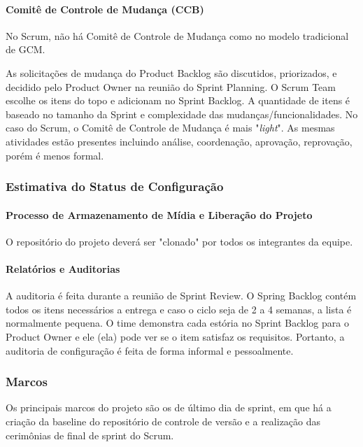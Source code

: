\paragraph{Comitê de Controle de Mudança (CCB)}

No Scrum, não há Comitê de Controle de Mudança como no modelo tradicional de GCM.

As solicitações de mudança do Product Backlog são discutidos, priorizados, e decidido pelo Product Owner na reunião do Sprint Planning. O Scrum Team escolhe os itens do topo e adicionam no Sprint Backlog. A quantidade de itens é baseado no tamanho da Sprint e complexidade das mudanças/funcionalidades. No caso do Scrum, o Comitê de Controle de Mudança é mais "\textit{light}". As mesmas atividades estão presentes incluindo análise, coordenação, aprovação, reprovação, porém é menos formal.


\subsubsection{Estimativa do Status de Configuração}

\paragraph{Processo de Armazenamento de Mídia e Liberação do Projeto}

O repositório do projeto deverá ser "clonado" por todos os integrantes da equipe.

\paragraph{Relatórios e Auditorias}

A auditoria é feita durante a reunião de Sprint Review. O Spring Backlog contém todos os itens necessários a entrega e caso o ciclo seja de 2 a 4 semanas, a lista é normalmente pequena.
O time demonstra cada estória no Sprint Backlog para o Product Owner e ele (ela) pode ver se o item satisfaz os requisitos. Portanto, a auditoria de configuração é feita de forma informal e pessoalmente.

\subsubsection{Marcos}

Os principais marcos do projeto são os de último dia de sprint, em que há a criação da baseline do repositório de controle de versão e a realização das cerimônias de final de sprint do Scrum. 

